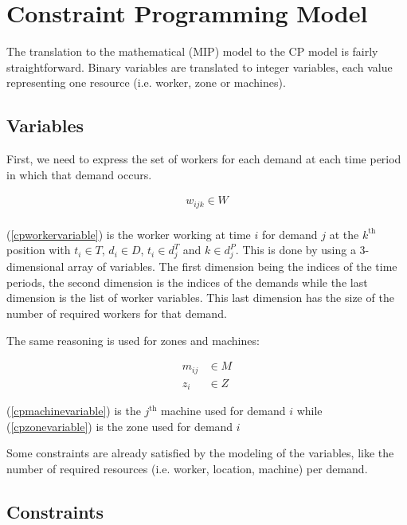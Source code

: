 \documentclass[../thesis.tex]{subfiles}
\begin{document}
\section{Constraint Programming Model}

The translation to the mathematical (MIP) model to the CP model is fairly
straightforward. Binary variables are translated to integer variables, each value representing
one resource (i.e. worker, zone or machines).



\subsection{Variables}

First, we need to express the set of workers for each demand at each time period in which that demand occurs.

\begin{equation}
\begin{split}
    w_{ijk} \in W \label{cpworkervariable} \\
\end{split}
\end{equation}

(\ref{cpworkervariable}) is the worker working at time $i$ for demand $j$ at the $k^{\text{th}}$ position 
with $t_i \in T$, $d_i \in D$, $t_i \in d_j^T$ and $k \in d^P_j$. This is done by using a 3-dimensional array of variables. The first dimension being the indices of the 
time periods, the second dimension is the indices of the demands while the last dimension is the list of worker variables. 
This last dimension has the size of the number of required workers for that demand.

The same reasoning is used for zones and machines:

\begin{align}
    m_{ij} &\in M \label{cpmachinevariable} \\ 
    z_i &\in Z \label{cpzonevariable} 
\end{align}

(\ref{cpmachinevariable}) is the $j^{\text{th}}$ machine used for demand $i$ while (\ref{cpzonevariable}) is the zone used for demand $i$

Some constraints are already satisfied by the modeling of the variables, like the number of required resources (i.e. worker, location, machine)
per demand.

\subsection{Constraints}
\end{document}
